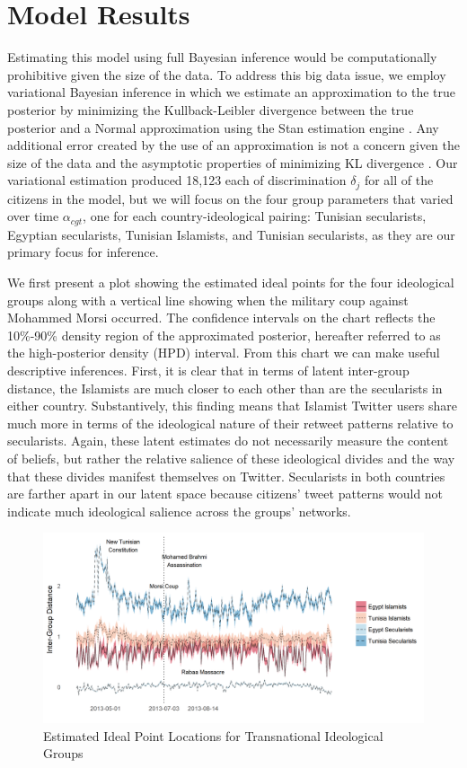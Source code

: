 \documentclass[12pt]{article}
\begin{document}
\section*{Model Results}

Estimating this model using full Bayesian inference would be computationally prohibitive given the size of the data. To address this big data issue, we employ variational Bayesian inference in which we estimate an approximation to the true posterior by minimizing the Kullback-Leibler divergence between the true posterior and a Normal approximation using the Stan estimation engine \parencite{NIPS2015_5758}. Any additional error created by the use of an approximation is not a concern given the size of the data and the asymptotic properties of minimizing KL divergence \parencite{NIPS2015_5758}. Our variational estimation produced 18,123 each of discrimination $\delta_j$ for all of the citizens in the model, but we will focus on the four group parameters that varied over time $\alpha_{cgt}$, one for each country-ideological pairing: Tunisian secularists, Egyptian secularists, Tunisian Islamists, and Tunisian secularists, as they are our primary focus for inference.

We first present a plot showing the estimated ideal points for the four ideological groups along with a vertical line showing when the military coup against Mohammed Morsi occurred. The confidence intervals on the chart reflects the 10\%-90\% density region of the approximated posterior, hereafter referred to as the high-posterior density (HPD) interval. From this chart we can make useful descriptive inferences. First, it is clear that in terms of latent inter-group distance, the Islamists are much closer to each other than are the secularists in either country. Substantively, this finding means that Islamist Twitter users share much more in terms of the ideological nature of their retweet patterns relative to secularists. Again, these latent estimates do not necessarily measure the content of beliefs, but rather the relative salience of these ideological divides and the way that these divides manifest themselves on Twitter. Secularists in both countries are farther apart in our latent space because citizens' tweet patterns would not indicate much ideological salience across the groups' networks. 
 \begin{figure}[!h]
 	\centering
	\caption{Estimated Ideal Point Locations for Transnational Ideological Groups}\label{arab_id_facet}
	\centering
	\includegraphics[width=.9\linewidth]{arab_ideology}
\end{figure}
\end{document}
